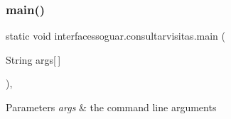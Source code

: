 \subsubsection{\texorpdfstring{main()}{main()}}
{\footnotesize\ttfamily static void interfacessoguar.\+consultarvisitas.\+main (\begin{DoxyParamCaption}\item[{String}]{args\mbox{[}$\,$\mbox{]} }\end{DoxyParamCaption})\hspace{0.3cm}{\ttfamily [inline]}, {\ttfamily [static]}}


\begin{DoxyParams}{Parameters}
{\em args} & the command line arguments \\
\hline
\end{DoxyParams}

